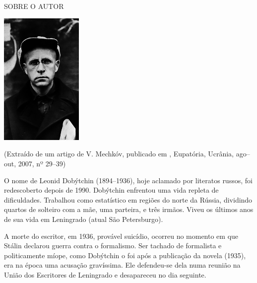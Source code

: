 \clearpage
\thispagestyle{empty}

\movetooddpage
\small\MyriadPro\itshape
\label{colaboradores}

\noindent{}SOBRE O AUTOR\\

\begin{center}
\includegraphics[width=4cm]{./autor1.jpg}
\end{center}

\epigraph{{}}{(Extraído de um artigo de V. Mechkóv, publicado em {}, Eupatória, Ucrânia, ago–out, 2007, nº 29–39)}

O nome de Leonid Dobýtchin (1894–1936), hoje aclamado por literatos
russos, foi redescoberto depois de 1990. Dobýtchin enfrentou uma vida
repleta de dificuldades. Trabalhou como estatístico em regiões do norte
da Rússia, dividindo quartos de solteiro com a mãe, uma parteira, e três
irmãos. Viveu os últimos anos de sua vida em Leningrado (atual São
Petersburgo).

A morte do escritor, em 1936, provável suicídio, ocorreu no momento em
que Stálin declarou guerra contra o formalismo. Ser tachado de
formalista e politicamente míope, como Dobýtchin o foi após a publicação
da novela {} (1935), era na época uma acusação
gravíssima. Ele defendeu-se dela numa reunião na União dos Escritores de
Leningrado e desapareceu no dia seguinte.

